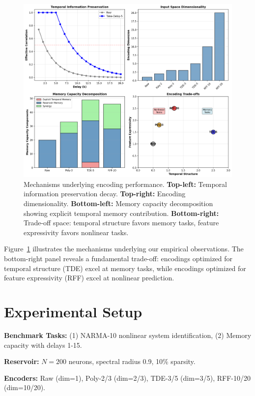 \documentclass[11pt]{article}
\begin{document}
\begin{figure}[t]
    \centering
    \includegraphics[width=\textwidth]{encoding_mechanisms.png}
    \caption{Mechanisms underlying encoding performance. \textbf{Top-left:} Temporal information preservation decay. \textbf{Top-right:} Encoding dimensionality. \textbf{Bottom-left:} Memory capacity decomposition showing explicit temporal memory contribution. \textbf{Bottom-right:} Trade-off space: temporal structure favors memory tasks, feature expressivity favors nonlinear tasks.}
    \label{fig:mechanisms}
\end{figure}

Figure~\ref{fig:mechanisms} illustrates the mechanisms underlying our empirical observations. The bottom-right panel reveals a fundamental trade-off: encodings optimized for temporal structure (TDE) excel at memory tasks, while encodings optimized for feature expressivity (RFF) excel at nonlinear prediction.

\section{Experimental Setup}

\textbf{Benchmark Tasks:} (1) NARMA-10 nonlinear system identification, (2) Memory capacity with delays 1-15.

\textbf{Reservoir:} $N=200$ neurons, spectral radius 0.9, 10\% sparsity.

\textbf{Encoders:} Raw (dim=1), Poly-2/3 (dim=2/3), TDE-3/5 (dim=3/5), RFF-10/20 (dim=10/20).
\end{document}
